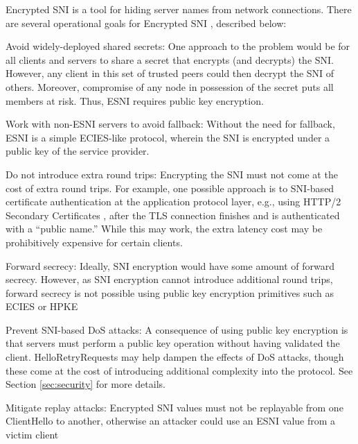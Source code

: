 \documentclass{article}
\theoremstyle{definition}
\theoremstyle{definition}
\begin{document}

Encrypted SNI is a tool for hiding server names from network connections. There are several operational goals 
for Encrypted SNI \cite{requirements}, described below:
%
\begin{compactitem}
  \item Avoid widely-deployed shared secrets: One approach to the problem would be for all
  clients and servers to share a secret that encrypts (and decrypts) the SNI. However, any 
  client in this set of trusted peers could then decrypt the SNI of others. Moreover, compromise
  of any node in possession of the secret puts all members at risk. Thus, ESNI requires 
  public key encryption.
  \item Work with non-ESNI servers to avoid fallback: Without the need for fallback, ESNI 
  is a simple ECIES-like protocol, wherein the SNI is encrypted under a public key of the 
  service provider.
  \item Do not introduce extra round trips: Encrypting the SNI must not come at the cost of 
  extra round trips. For example, one possible approach is to SNI-based certificate authentication
  at the application protocol layer, e.g., using HTTP/2 Secondary Certificates \cite{ietf-httpbis-http2-secondary-certs-04}, after
  the TLS connection finishes and is authenticated with a ``public name.'' While this may work,
  the extra latency cost may be prohibitively expensive for certain clients.
  \item Forward secrecy: Ideally, SNI encryption would have some amount of forward secrecy.
  However, as SNI encryption cannot introduce additional round trips, forward secrecy is not
  possible using public key encryption primitives such as ECIES \cite{shoup2001proposal} or HPKE \cite{irtf-cfrg-hpke-00}
  \item Prevent SNI-based DoS attacks: A consequence of using public key encryption is that
  servers must perform a public key operation without having validated the client. HelloRetryRequests
  may help dampen the effects of DoS attacks, though these come at the cost of introducing
  additional complexity into the protocol. See Section \ref{sec:security} for more details.
  \item Mitigate replay attacks: Encrypted SNI values must not be replayable from one 
  ClientHello to another, otherwise an attacker could use an ESNI value from a victim client

\end{compactitem}
\end{document}
